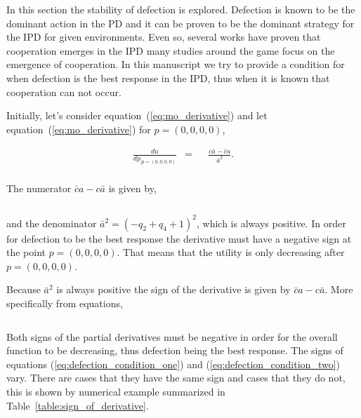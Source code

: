 \documentclass[10pt]{article}
\begin{document}
In this section the stability of defection is explored. Defection is
known to be the dominant action in the PD and it can be proven to be the dominant
strategy for the IPD for given environments. Even so, several works have proven
that cooperation emerges in the IPD many studies around the game focus on the
emergence of cooperation. In this manuscript we try to provide a condition for when
defection is the best response in the IPD, thus when it is known that cooperation can
not occur.

Initially, let's consider equation~(\ref{eq:mo_derivative}) and let
equation~(\ref{eq:mo_derivative}) for \(p = (0, 0, 0, 0)\),

\begin{equation}\label{eq:derivative_of_quadratic_zero}
    \begin{aligned}
     \frac{du}{dp_{| p=(0, 0, 0, 0)}} & = && \frac{c \bar{a} - \bar{c}a}
      {\bar{a}^2} .\\
    \end{aligned}
\end{equation}

The numerator \(\bar{c}a - c\bar{a}\) is given by,

\[\]

and the denominator \(\bar{a} ^ 2 = (-q_2 + q_4 + 1) ^ 2\), which is always positive. In order
for defection to be the best response the derivative must have a negative
sign at the point \(p = (0, 0, 0, 0)\). That means that the utility is only
decreasing after \(p = (0, 0, 0, 0)\).

Because \(\bar{a} ^ 2\) is always positive the sign of the derivative is given by \(\bar{c}a - c\bar{a}\).
More specifically from equations,

\begin{equation}\label{eq:defection_condition_one}
    
\end{equation}
\begin{equation}\label{eq:defection_condition_two}
    
\end{equation}

Both signs of the partial derivatives must be negative in order for the overall
function to be decreasing, thus defection being the best response.
The signs of equations (\ref{eq:defection_condition_one}) and (\ref{eq:defection_condition_two})
vary. There are cases that they have the same sign and cases that they do not,
this is shown by numerical example summarized in Table~\ref{table:sign_of_derivative}.
\end{document}
